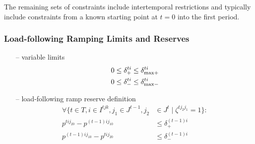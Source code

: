 \documentclass[12pt]{article}
\numberwithin{equation}{section}
\numberwithin{table}{section}
\numberwithin{figure}{section}
\begin{document}

The remaining sets of constraints include intertemporal restrictions and typically include constraints from a known starting point at $t=0$ into the first period.

\subsubsection*{Load-following Ramping Limits and Reserves}
\begin{itemize}
\item[--]  variable limits
\begin{align}
0 \leq \delta_+^{ti} &\leq  \delta^{ti}_{\rm max+} \label{eq:deltapbounds} \\
0 \leq \delta_-^{ti} &\leq  \delta^{ti}_{\rm max-}  \label{eq:deltambounds}
\end{align}
\item[--] load-following ramp reserve definition
\begin{align}
\forall \{t \in T, i \in I^{tjk}, j_1 \in J^{t-1}, j_2 &\in J^t \mid \zeta^{tj_2j_1} = 1 \}: \label{eq:rampconstrdef} \\
p^{tij_20} - p^{(t-1)ij_10} &\leq \delta_+^{(t-1)i} \label{eq:inter1} \\
p^{(t-1)ij_10} - p^{tij_20} &\leq \delta_-^{(t-1)i} \label{eq:rampconstr}
\end{align}
\end{itemize}
\end{document}
